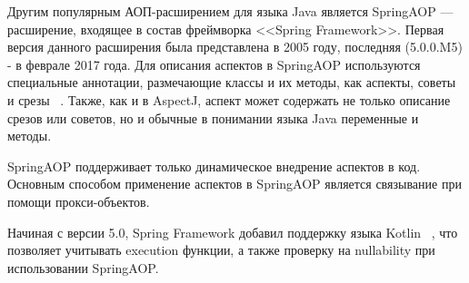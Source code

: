\documentclass[conference]{IEEEtran}
\begin{document}
Другим популярным АОП-расширением для языка Java является SpringAOP ---
расширение, входящее в состав фреймворка <<Spring Framework>>.
Первая версия данного расширения была представлена в 2005 году, последняя
 (5.0.0.M5) - в феврале 2017 года.
Для описания аспектов в SpringAOP используются специальные аннотации,
размечающие классы и их методы, как аспекты, советы и срезы
~\cite{springAOP_doc}.
Также, как и в AspectJ, аспект может содержать не только описание срезов или
советов, но и обычные в понимании языка Java переменные и методы.


SpringAOP поддерживает только динамическое внедрение аспектов в код.
Основным способом применение аспектов в SpringAOP является связывание при
помощи прокси-объектов.

Начиная с версии 5.0, Spring Framework добавил поддержку языка Kotlin~
\cite{springAOP_5_release}, что позволяет учитывать execution функции, а также
проверку на nullability при использовании SpringAOP.
\end{document}
